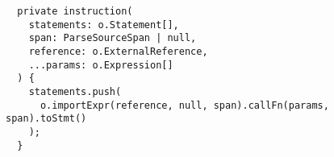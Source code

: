 \begin{verbatim}
  private instruction(
    statements: o.Statement[],
    span: ParseSourceSpan | null,
    reference: o.ExternalReference,
    ...params: o.Expression[]
  ) {
    statements.push(
      o.importExpr(reference, null, span).callFn(params, span).toStmt()
    );
  }
\end{verbatim}
